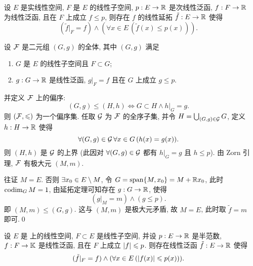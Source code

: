 	\begin{Theorem}
		设 $ E $ 是实线性空间, $ F $ 是 $ E $ 的线性子空间, $ p: E\to\mathbb{R} $ 是次线性泛函, $ f : F\to\mathbb{R} $ 为线性泛函, 且在 $ F $ 上成立 $ f\leqslant p $, 则存在 $ f $ 的线性延拓 $ \tilde{f}:E\to\mathbb{R} $ 使得
		\[
			(\tilde{f}|_{F}=f)\land(\forall x\in E\,(\tilde{f}(x)\leqslant p(x))).
		\]
	\end{Theorem}
	\begin{Proof}
		设 $ \mathcal{F} $ 是二元组 $ (G, g) $ 的全体, 其中 $ (G, g) $ 满足
		\begin{enumerate}[(1)]
			\item $ G $ 是 $ E $ 的线性子空间且 $ F\subset G $;
			\item $ g:G\to \mathbb{R} $ 是线性泛函, $ g|_{F}=f $ 且在 $ G $ 上成立 $ g\leqslant p $.
		\end{enumerate}
		并定义 $ \mathcal{F} $ 上的偏序:
		\[
			(G, g)\leqslant (H, h)\Longleftrightarrow G\subset H \land h|_{G}=g.
		\]
		则 $ (\mathcal{F}, \leqslant) $ 为一个偏序集. 任取 $ \mathcal{G} $ 为 $ \mathcal{F} $ 的全序子集, 并令 $ H = \bigcup_{(G, g)\in\mathcal{G}}G $, 定义 $ h:H\to\mathbb{R} $ 使得
		\[
			\forall (G, g)\in\mathcal{G}\,\forall x\in G\,(h(x)=g(x)).
		\]
		则 $ (H, h) $ 是 $ \mathcal{G} $ 的上界 (此因对 $ \forall (G, g)\in\mathcal{G} $ 都有 $ h|_{G}=g $ 且 $ h\leqslant p $). 由 Zorn 引理, $ \mathcal{F} $ 有极大元 $ (M, m) $.

		往证 $ M=E $. 否则 $ \exists x_{0}\in E\setminus M $, 令 $ G = \operatorname{span}\{ M, x_{0} \}=M+\mathbb{R} x_{0} $, 此时 $ \operatorname{codim}_{G}M=1 $, 由延拓定理可知存在 $ g:G\to\mathbb{R} $, 使得
		\[
			(g|_{M} = m) \land (g\leqslant p).
		\]
		即 $ (M, m)\leqslant(G, g) $. 这与 $ (M, m) $ 是极大元矛盾, 故 $ M = E $, 此时取 $ \tilde{f}=m $ 即可.\qed
	\end{Proof}
	\begin{Theorem}
		设 $ E $ 是 \K 上的线性空间, $ F\subset E $ 是线性子空间, 并设 $ p:E\to\mathbb{R} $ 是半范数, $ f:F\to\mathbb{K} $ 是线性泛函, 且在 $ F $ 上成立 $ \left| f \right| \leqslant p $. 则存在线性泛函 $ \tilde{f}:E\to\mathbb{R} $ 使得
		\[
			(\tilde{f}|_{F}=f)\land(\forall x\in E\,(\left| f(x) \right| \leqslant p(x))).
		\]
	\end{Theorem}
